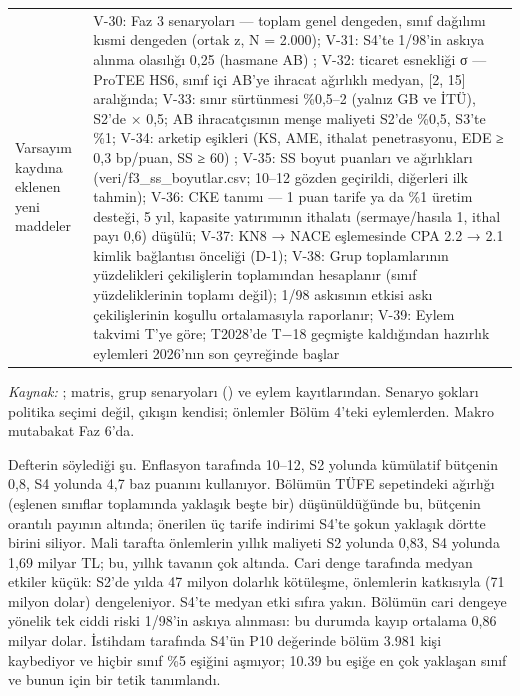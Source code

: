 \begin{longtable}[]{@{}
  >{\raggedright\arraybackslash}p{}
  >{\raggedright\arraybackslash}p{}@{}}
Varsayım kaydına eklenen yeni maddeler & V-30: Faz 3 senaryoları --- toplam genel dengeden, sınıf dağılımı kısmi dengeden (ortak z, N = 2.000); V-31: S4'te 1/98'in askıya alınma olasılığı 0,25 (hasmane AB) \etiketH{}; V-32: ticaret esnekliği σ --- ProTEE HS6, sınıf içi AB'ye ihracat ağırlıklı medyan, {[}2, 15{]} aralığında; V-33: sınır sürtünmesi \%0,5--2 (yalnız GB ve İTÜ), S2'de × 0,5; AB ihracatçısının menşe maliyeti S2'de \%0,5, S3'te \%1; V-34: arketip eşikleri (KS, AME, ithalat penetrasyonu, EDE ≥ 0,3 bp/puan, SS ≥ 60) \etiketH{}; V-35: SS boyut puanları ve ağırlıkları \etiketH{} (veri/f3\_ss\_boyutlar.csv; 10--12 gözden geçirildi, diğerleri ilk tahmin); V-36: CKE tanımı --- 1 puan tarife ya da \%1 üretim desteği, 5 yıl, kapasite yatırımının ithalatı (sermaye/hasıla 1, ithal payı 0,6) düşülü; V-37: KN8 → NACE eşlemesinde CPA 2.2 → 2.1 kimlik bağlantısı önceliği (D-1); V-38: Grup toplamlarının yüzdelikleri çekilişlerin toplamından hesaplanır (sınıf yüzdeliklerinin toplamı değil); 1/98 askısının etkisi askı çekilişlerinin koşullu ortalamasıyla raporlanır; V-39: Eylem takvimi T'ye göre; T2028'de T−18 geçmişte kaldığından hazırlık eylemleri 2026'nın son çeyreğinde başlar \\
\end{longtable}

\endgroup

\emph{Kaynak:} ; matris, grup senaryoları () ve eylem kayıtlarından. Senaryo şokları politika seçimi değil, çıkışın kendisi; önlemler Bölüm 4'teki eylemlerden. Makro mutabakat Faz 6'da.

Defterin söylediği şu. Enflasyon tarafında 10--12, S2 yolunda kümülatif bütçenin 0,8, S4 yolunda 4,7 baz puanını kullanıyor. Bölümün TÜFE sepetindeki ağırlığı (eşlenen sınıflar toplamında yaklaşık beşte bir) düşünüldüğünde bu, bütçenin orantılı payının altında; önerilen üç tarife indirimi S4'te şokun yaklaşık dörtte birini siliyor. Mali tarafta önlemlerin yıllık maliyeti S2 yolunda 0,83, S4 yolunda 1,69 milyar TL; bu, yıllık tavanın çok altında. Cari denge tarafında medyan etkiler küçük: S2'de yılda 47 milyon dolarlık kötüleşme, önlemlerin katkısıyla (71 milyon dolar) dengeleniyor. S4'te medyan etki sıfıra yakın. Bölümün cari dengeye yönelik tek ciddi riski 1/98'in askıya alınması: bu durumda kayıp ortalama 0,86 milyar dolar. İstihdam tarafında S4'ün P10 değerinde bölüm 3.981 kişi kaybediyor ve hiçbir sınıf \%5 eşiğini aşmıyor; 10.39 bu eşiğe en çok yaklaşan sınıf ve bunun için bir tetik tanımlandı.

